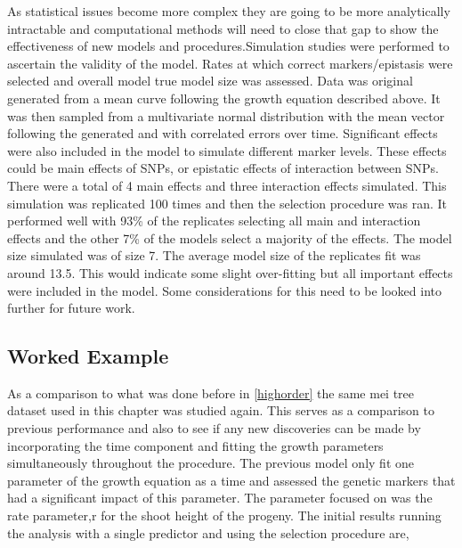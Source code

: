 \documentclass[11pt,]{book}
\theoremstyle{definition}
\theoremstyle{definition}
\theoremstyle{remark}
\begin{document}
As statistical issues become more complex they are going to be more
analytically intractable and computational methods will need to close
that gap to show the effectiveness of new models and
procedures.Simulation studies were performed to ascertain the validity
of the model. Rates at which correct markers/epistasis were selected and
overall model true model size was assessed. Data was original generated
from a mean curve following the growth equation described above. It was
then sampled from a multivariate normal distribution with the mean
vector following the generated and with correlated errors over time.
Significant effects were also included in the model to simulate
different marker levels. These effects could be main effects of SNPs, or
epistatic effects of interaction between SNPs. There were a total of 4
main effects and three interaction effects simulated. This simulation
was replicated 100 times and then the selection procedure was ran. It
performed well with 93\% of the replicates selecting all main and
interaction effects and the other 7\% of the models select a majority of
the effects. The model size simulated was of size 7. The average model
size of the replicates fit was around 13.5. This would indicate some
slight over-fitting but all important effects were included in the
model. Some considerations for this need to be looked into further for
future work.

\subsection{Worked Example}\label{worked-example-1}

As a comparison to what was done before in \ref{highorder} the same mei
tree dataset used in this chapter was studied again. This serves as a
comparison to previous performance and also to see if any new
discoveries can be made by incorporating the time component and fitting
the growth parameters simultaneously throughout the procedure. The
previous model only fit one parameter of the growth equation as a time
and assessed the genetic markers that had a significant impact of this
parameter. The parameter focused on was the rate parameter,r for the
shoot height of the progeny. The initial results running the analysis
with a single predictor and using the selection procedure are,
\end{document}
